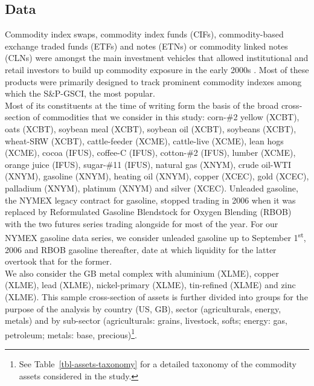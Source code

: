 \documentclass[
  authoryear,
  preprint,
  3p]{elsarticle}
\begin{document}
\subsection{Data}\label{sec-data}

Commodity index swaps, commodity index funds (CIFs), commodity-based
exchange traded funds (ETFs) and notes (ETNs) or commodity linked notes
(CLNs) were amongst the main investment vehicles that allowed
institutional and retail investors to build up commodity exposure in the
early 2000s
\citep{boons_stock_2012, henderson_new_2015, irwin_index_2011, unctad_global_2009, schumann_hunger_2011}.
Most of these products were primarily designed to track prominent
commodity indexes among which the S\&P-GSCI, the most popular.\\
Most of its constituents at the time of writing form the basis of the
broad cross-section of commodities that we consider in this study:
corn-\#2 yellow (XCBT), oats (XCBT), soybean meal (XCBT), soybean oil
(XCBT), soybeans (XCBT), wheat-SRW (XCBT), cattle-feeder (XCME),
cattle-live (XCME), lean hogs (XCME), cocoa (IFUS), coffee-C (IFUS),
cotton-\#2 (IFUS), lumber (XCME), orange juice (IFUS), sugar-\#11
(IFUS), natural gas (XNYM), crude oil-WTI (XNYM), gasoline (XNYM),
heating oil (XNYM), copper (XCEC), gold (XCEC), palladium (XNYM),
platinum (XNYM) and silver (XCEC). Unleaded gasoline, the NYMEX legacy
contract for gasoline, stopped trading in 2006 when it was replaced by
Reformulated Gasoline Blendstock for Oxygen Blending (RBOB) with the two
futures series trading alongside for most of the year. For our NYMEX
gasoline data series, we consider unleaded gasoline up to September
1\textsuperscript{st}, 2006 and RBOB gasoline thereafter, date at which
liquidity for the latter overtook that for the former.\\
We also consider the GB metal complex with aluminium (XLME), copper
(XLME), lead (XLME), nickel-primary (XLME), tin-refined (XLME) and zinc
(XLME). This sample cross-section of assets is further divided into
groups for the purpose of the analysis by country (US, GB), sector
(agriculturals, energy, metals) and by sub-sector (agriculturals:
grains, livestock, softs; energy: gas, petroleum; metals: base,
precious)\footnote{See Table~\ref{tbl-assets-taxonomy} for a detailed
  taxonomy of the commodity assets considered in the study.}.

\medskip
\end{document}
